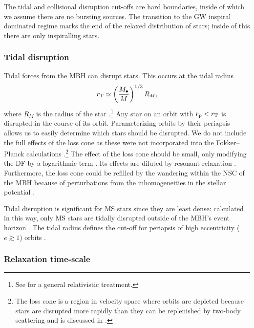 The tidal and collisional disruption cut-offs are hard boundaries, inside of which we assume there are no bursting sources. The transition to the GW inspiral dominated regime marks the end of the relaxed distribution of stars; inside of this there are only inspiralling stars.

\subsubsection{Tidal disruption}\label{sec:Tidal}

Tidal forces from the MBH can disrupt stars. This occurs at the tidal radius
\begin{equation}
r_\mathrm{T} \simeq \left(\dfrac{M_\bullet}{M}\right)^{1/3}R_M,
\label{eq:Tidal}
\end{equation}
where $R_M$ is the radius of the star \citep{Hills1975, Rees1988, Kobayashi2004}.\footnote{See \citet{Kesden2012} for a general relativistic treatment.} Any star on an orbit with $r_\mathrm{p} < r_\mathrm{T}$ is disrupted in the course of its orbit. Parameterizing orbits by their periapsis allows us to easily determine which stars should be disrupted. We do not include the full effects of the loss cone \citep{Frank1976, Lightman1977, Cohn1978} as these were not incorporated into the Fokker--Planck calculations \citep{Hopman2009}.\footnote{The loss cone is a region in velocity space where orbits are depleted because stars are disrupted more rapidly than they can be replenished by two-body scattering and is discussed in .} The effect of the loss cone should be small, only modifying the DF by a logarithmic term \citep{Lightman1977, Bahcall1977, Cohn1978}. Its effects are diluted by resonant relaxation \citep{Hopman2007,Toonen2009,Merritt2011}. Furthermore, the loss cone could be refilled by the wandering within the NSC of the MBH because of perturbations from the inhomogeneities in the stellar potential \citep{Sigurdsson1997,Chatterjee2002,Merritt2007}.

Tidal disruption is significant for MS stars since they are least dense: calculated in this way, only MS stars are tidally disrupted outside of the MBH's event horizon \citep{Sigurdsson1997}. The tidal radius defines the cut-off for periapsis of high eccentricity ($e \gtrsim 1$) orbits \citep{Lightman1977}.

\subsubsection{Relaxation time-scale}\label{sec:Relax}

